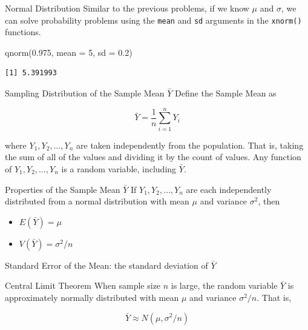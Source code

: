 \documentclass[
  ignorenonframetext,
]{beamer}
\newenvironment{Shaded}{\begin{snugshade}}{\end{snugshade}}
\newcommand{\AttributeTok}[1]{\textcolor[rgb]{0.40,0.45,0.13}{#1}}
\newcommand{\DecValTok}[1]{\textcolor[rgb]{0.68,0.00,0.00}{#1}}
\newcommand{\FloatTok}[1]{\textcolor[rgb]{0.68,0.00,0.00}{#1}}
\newcommand{\FunctionTok}[1]{\textcolor[rgb]{0.28,0.35,0.67}{#1}}
\newcommand{\NormalTok}[1]{\textcolor[rgb]{0.00,0.23,0.31}{#1}}
\providecommand{\tightlist}{%
  \setlength{\itemsep}{0pt}\setlength{\parskip}{0pt}}
\begin{document}
\begin{frame}[fragile]{Normal Distribution}
\protect{}\label{normal-distribution}
Similar to the previous problems, if we know \(\mu\) and \(\sigma\), we
can solve probability problems using the \texttt{mean} and \texttt{sd}
arguments in the \texttt{xnorm()} functions.

\begin{Shaded}
\begin{Highlighting}[]
\FunctionTok{qnorm}\NormalTok{(}\FloatTok{0.975}\NormalTok{, }\AttributeTok{mean =} \DecValTok{5}\NormalTok{, }\AttributeTok{sd =} \FloatTok{0.2}\NormalTok{)}
\end{Highlighting}
\end{Shaded}

\begin{verbatim}
[1] 5.391993
\end{verbatim}
\end{frame}

\begin{frame}{Sampling Distribution of the Sample Mean \(\bar{Y}\)}
\protect{}\label{sampling-distribution-of-the-sample-mean-bary}
Define the Sample Mean as

\[
\bar{Y}=\frac1n\sum_{i=1}^n Y_i
\]

where \(Y_1,Y_2,\dots,Y_n\) are taken independently from the population.
That is, taking the sum of all of the values and dividing it by the
count of values. Any function of \(Y_1,Y_2,\dots,Y_n\) is a random
variable, including \(\bar{Y}\).
\end{frame}

\begin{frame}{Properties of the Sample Mean \(\bar{Y}\)}
\protect{}\label{properties-of-the-sample-mean-bary}
If \(Y_1,Y_2,\dots,Y_n\) are each independently distributed from a
normal distribution with mean \(\mu\) and variance \(\sigma^2\), then

\begin{itemize}
\tightlist
\item
  \(E(\bar{Y})=\mu\)
\item
  \(V(\bar{Y})=\sigma^2/n\)
\end{itemize}

Standard Error of the Mean: the standard deviation of \(\bar{Y}\)
\end{frame}

\begin{frame}{Central Limit Theorem}
\protect{}\label{central-limit-theorem}
When sample size \(n\) is large, the random variable \(\bar{Y}\) is
approximately normally distributed with mean \(\mu\) and variance
\(\sigma^2/n\). That is,

\[
\bar{Y}\approx N(\mu,\sigma^2/n)
\]
\end{frame}
\end{document}
